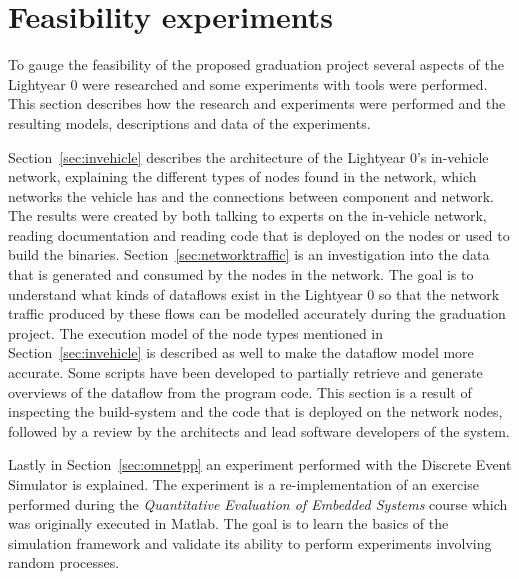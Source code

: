 \section{Feasibility experiments}
\label{sec:feasibility}
To gauge the feasibility of the proposed graduation project several aspects of the Lightyear 0 were researched and some experiments with tools were performed. This section describes how the research and experiments were performed and the resulting models, descriptions and data of the experiments.

Section~\ref{sec:invehicle} describes the architecture of the Lightyear 0's in-vehicle network, explaining the different types of nodes found in the network, which networks the vehicle has and the connections between component and network. The results were created by both talking to experts on the in-vehicle network, reading documentation and reading code that is deployed on the nodes or used to build the binaries. 
Section~\ref{sec:networktraffic} is an investigation into the data that is generated and consumed by the nodes in the network. The goal is to understand what kinds of dataflows exist in the Lightyear 0 so that the network traffic produced by these flows can be modelled accurately during the graduation project. The execution model of the node types mentioned in Section~\ref{sec:invehicle} is described as well to make the dataflow model more accurate. Some scripts have been developed to partially retrieve and generate overviews of the dataflow from the program code. This section is a result of inspecting the build-system and the code that is deployed on the network nodes, followed by a review by the architects and lead software developers of the system.

Lastly in Section~\ref{sec:omnetpp} an experiment performed with the Discrete Event Simulator \omnet is explained. The experiment is a re-implementation of an exercise performed during the \textit{Quantitative Evaluation of Embedded Systems} course which was originally executed in Matlab. The goal is to learn the basics of the simulation framework and validate its ability to perform experiments involving random processes.


\clearpage

\clearpage


\newpage